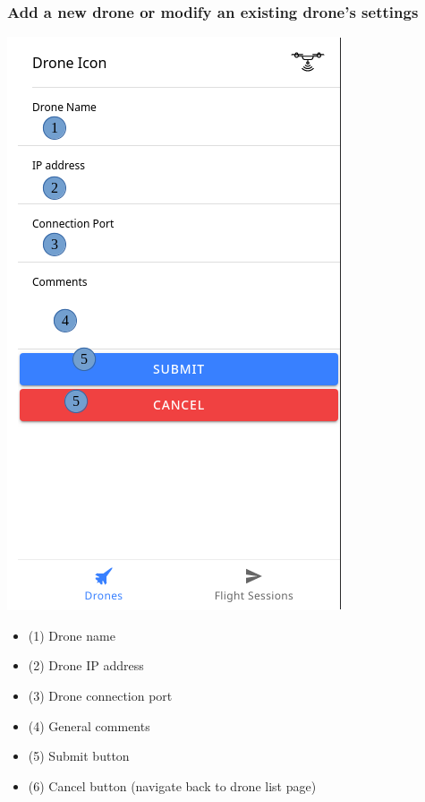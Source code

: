 \subsubsection{Add a new drone or modify an existing drone's settings}
\begin{minipage}[c]{0.5\linewidth}
	\centering
	\includegraphics[scale=0.4]{./assets/images/add-new.png}
	\label{fig: settingsPageDroneAdd}
\end{minipage}
\begin{minipage}[c]{0.5\linewidth}
	\begin{itemize}
		\item (1) Drone name
		\item (2) Drone IP address
		\item (3) Drone connection port
		\item (4) General comments
		\item (5) Submit button
		\item (6) Cancel button (navigate back to drone list page)
	\end{itemize}
\end{minipage}

